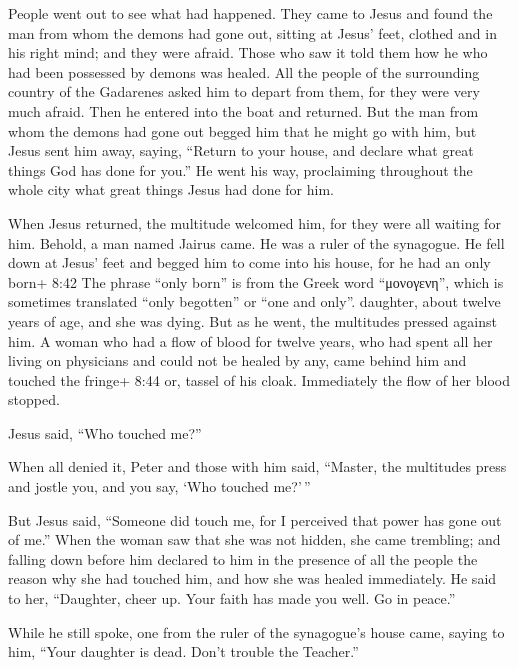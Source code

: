  People went out to see what had happened. They came to
Jesus and found the man from whom the demons had gone out, sitting at
Jesus' feet, clothed and in his right mind; and they were afraid.
 Those who saw it told them how he who had been possessed
by demons was healed.  All the people of the surrounding
country of the Gadarenes asked him to depart from them, for they were
very much afraid. Then he entered into the boat and returned.
 But the man from whom the demons had gone out begged him
that he might go with him, but Jesus sent him away, saying,
 ``Return to your house, and declare what great things God
has done for you.'' He went his way, proclaiming throughout the whole
city what great things Jesus had done for him.

 When Jesus returned, the multitude welcomed him, for they
were all waiting for him.  Behold, a man named Jairus came.
He was a ruler of the synagogue. He fell down at Jesus' feet and begged
him to come into his house,  for he had an only born+ 8:42
The phrase ``only born'' is from the Greek word ``μονογενη'', which is
sometimes translated ``only begotten'' or ``one and only''. daughter,
about twelve years of age, and she was dying. But as he went, the
multitudes pressed against him.  A woman who had a flow of
blood for twelve years, who had spent all her living on physicians and
could not be healed by any,  came behind him and touched
the fringe+ 8:44 or, tassel of his cloak. Immediately the flow of her
blood stopped.

 Jesus said, ``Who touched me?''

When all denied it, Peter and those with him said, ``Master, the
multitudes press and jostle you, and you say, `Who touched me?'\,''

 But Jesus said, ``Someone did touch me, for I perceived
that power has gone out of me.''  When the woman saw that
she was not hidden, she came trembling; and falling down before him
declared to him in the presence of all the people the reason why she had
touched him, and how she was healed immediately.  He said
to her, ``Daughter, cheer up. Your faith has made you well. Go in
peace.''

 While he still spoke, one from the ruler of the
synagogue's house came, saying to him, ``Your daughter is dead. Don't
trouble the Teacher.''

